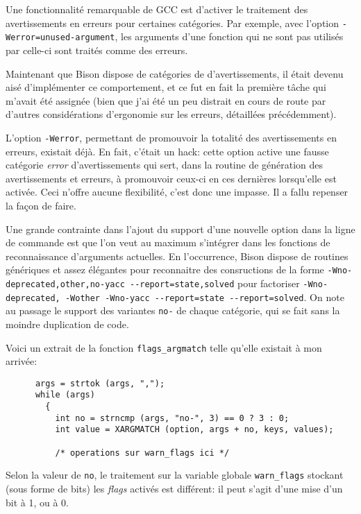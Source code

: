 \documentclass[a4paper,11pt,twoside,final]{article}
\begin{document}
  Une fonctionnalité remarquable de GCC est d'activer le traitement des
  avertissements en erreurs pour certaines catégories. Par exemple, avec
  l'option \texttt{-Werror=unused-argument}, les arguments d'une fonction qui
  ne sont pas utilisés par celle-ci sont traités comme des erreurs.

  Maintenant que Bison dispose de catégories de d'avertissements, il était
  devenu aisé d'implémenter ce comportement, et ce fut en fait la première
  tâche qui m'avait été assignée (bien que j'ai été un peu distrait en cours de
  route par d'autres considérations d'ergonomie sur les erreurs, détaillées
  précédemment).

  L'option \texttt{-Werror}, permettant de promouvoir la totalité des
  avertissements en erreurs, existait déjà. En fait, c'était un hack: cette
  option active une fausse catégorie \textit{error} d'avertissements qui sert,
  dans la routine de génération des avertissements et erreurs, à promouvoir
  ceux-ci en ces dernières lorsqu'elle est activée. Ceci n'offre aucune
  flexibilité, c'est donc une impasse. Il a fallu repenser la façon de faire.

  Une grande contrainte dans l'ajout du support d'une nouvelle option dans la
  ligne de commande est que l'on veut au maximum s'intégrer dans les fonctions
  de reconnaissance d'arguments actuelles. En l'occurrence, Bison dispose de
  routines génériques et assez élégantes pour reconnaitre des consructions de
  la forme \texttt{-Wno-deprecated,other,no-yacc -{}-report=state,solved} pour
  factoriser \texttt{-Wno-deprecated, -Wother -Wno-yacc -{}-report=state
  -{}-report=solved}. On note au passage le support des variantes \texttt{no-}
  de chaque catégorie, qui se fait sans la moindre duplication de code.

  Voici un extrait de la fonction \texttt{flags\_argmatch} telle qu'elle
  existait à mon arrivée:

  \begin{verbatim}
      args = strtok (args, ",");
      while (args)
        {
          int no = strncmp (args, "no-", 3) == 0 ? 3 : 0;
          int value = XARGMATCH (option, args + no, keys, values);

          /* operations sur warn_flags ici */
  \end{verbatim}

  Selon la valeur de \texttt{no}, le traitement sur la variable globale
  \texttt{warn\_flags} stockant (sous forme de bits) les \textit{flags} activés
  est différent: il peut s'agit d'une mise d'un bit à 1, ou à 0.
\end{document}
